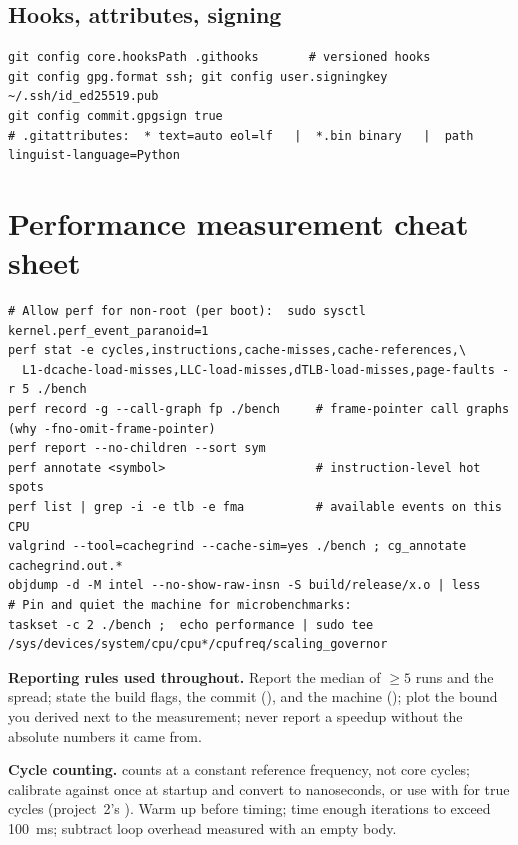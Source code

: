 \section*{Hooks, attributes, signing}
\begin{lstlisting}[style=sh]
git config core.hooksPath .githooks       # versioned hooks
git config gpg.format ssh; git config user.signingkey ~/.ssh/id_ed25519.pub
git config commit.gpgsign true
# .gitattributes:  * text=auto eol=lf   |  *.bin binary   |  path linguist-language=Python
\end{lstlisting}

\chapter{Performance measurement cheat sheet}
\label{app:perf}

\begin{lstlisting}[style=sh]
# Allow perf for non-root (per boot):  sudo sysctl kernel.perf_event_paranoid=1
perf stat -e cycles,instructions,cache-misses,cache-references,\
  L1-dcache-load-misses,LLC-load-misses,dTLB-load-misses,page-faults -r 5 ./bench
perf record -g --call-graph fp ./bench     # frame-pointer call graphs (why -fno-omit-frame-pointer)
perf report --no-children --sort sym
perf annotate <symbol>                     # instruction-level hot spots
perf list | grep -i -e tlb -e fma          # available events on this CPU
valgrind --tool=cachegrind --cache-sim=yes ./bench ; cg_annotate cachegrind.out.*
objdump -d -M intel --no-show-raw-insn -S build/release/x.o | less
# Pin and quiet the machine for microbenchmarks:
taskset -c 2 ./bench ;  echo performance | sudo tee /sys/devices/system/cpu/cpu*/cpufreq/scaling_governor
\end{lstlisting}

\textbf{Reporting rules used throughout.} Report the median of $\ge 5$ runs and the spread; state the build flags, the commit (), and the machine (); plot the bound you derived next to the measurement; never report a speedup without the absolute numbers it came from.

\textbf{Cycle counting.}  counts at a constant reference frequency, not core cycles; calibrate against  once at startup and convert to nanoseconds, or use  with  for true cycles (project~2's ). Warm up before timing; time enough iterations to exceed 100~ms; subtract loop overhead measured with an empty body.

